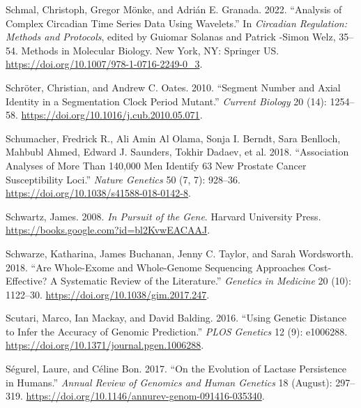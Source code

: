 \documentclass[
]{book}
\newlength{\cslhangindent}
\newlength{\cslentryspacingunit} %
\newenvironment{CSLReferences}[2] %
 {%
  \setlength{\parindent}{0pt}
  \ifodd #1
  \let\oldpar\par
  \def\par{\hangindent=\cslhangindent\oldpar}
  \fi
  \setlength{\parskip}{#2\cslentryspacingunit}
 }%
 {}
\begin{document}
\begin{CSLReferences}{1}{0}
\leavevmode{}%
Schmal, Christoph, Gregor Mönke, and Adrián E. Granada. 2022. {``Analysis of {Complex Circadian Time Series Data Using Wavelets}.''} In \emph{Circadian {Regulation}: {Methods} and {Protocols}}, edited by Guiomar Solanas and Patrick -Simon Welz, 35--54. Methods in {Molecular Biology}. {New York, NY}: {Springer US}. \url{https://doi.org/10.1007/978-1-0716-2249-0_3}.

\leavevmode{}%
Schröter, Christian, and Andrew C. Oates. 2010. {``Segment {Number} and {Axial Identity} in a {Segmentation Clock Period Mutant}.''} \emph{Current Biology} 20 (14): 1254--58. \url{https://doi.org/10.1016/j.cub.2010.05.071}.

\leavevmode{}%
Schumacher, Fredrick R., Ali Amin Al Olama, Sonja I. Berndt, Sara Benlloch, Mahbubl Ahmed, Edward J. Saunders, Tokhir Dadaev, et al. 2018. {``Association Analyses of More Than 140,000 Men Identify 63 New Prostate Cancer Susceptibility Loci.''} \emph{Nature Genetics} 50 (7, 7): 928--36. \url{https://doi.org/10.1038/s41588-018-0142-8}.

\leavevmode{}%
Schwartz, James. 2008. \emph{In {Pursuit} of the {Gene}}. {Harvard University Press}. \url{https://books.google.com?id=bl2KvwEACAAJ}.

\leavevmode{}%
Schwarze, Katharina, James Buchanan, Jenny C. Taylor, and Sarah Wordsworth. 2018. {``Are Whole-Exome and Whole-Genome Sequencing Approaches Cost-Effective? {A} Systematic Review of the Literature.''} \emph{Genetics in Medicine} 20 (10): 1122--30. \url{https://doi.org/10.1038/gim.2017.247}.

\leavevmode{}%
Scutari, Marco, Ian Mackay, and David Balding. 2016. {``Using {Genetic Distance} to {Infer} the {Accuracy} of {Genomic Prediction}.''} \emph{PLOS Genetics} 12 (9): e1006288. \url{https://doi.org/10.1371/journal.pgen.1006288}.

\leavevmode{}%
Ségurel, Laure, and Céline Bon. 2017. {``On the {Evolution} of {Lactase Persistence} in {Humans}.''} \emph{Annual Review of Genomics and Human Genetics} 18 (August): 297--319. \url{https://doi.org/10.1146/annurev-genom-091416-035340}.


\end{CSLReferences}
\end{document}
